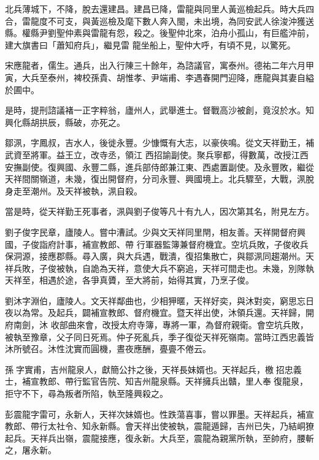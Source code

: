 \begin{pinyinscope}
 北兵薄城下，不降，脫去還建昌。建昌已降，雷龍與同里人黃巡檢起兵。時大兵四合，雷龍度不可支，與黃巡檢及麾下數人奔入閩，未出境，為同安武人徐浚沖獲送縣。權縣尹劉聖仲素與雷龍有怨，殺之。後聖仲北來，泊舟小孤山，有巨艦沖前，建大旗書曰「蕭知府兵」，繼見雷
 龍坐船上，聖仲大呼，有頃不見，以驚死。



 宋應龍者，儒生。通兵，出入行陳三十餘年，為諮議官，寓泰州。德祐二年六月甲寅，大兵至泰州，裨校孫貴、胡惟孝、尹端甫、李遇春開門迎降，應龍與其妻自縊於圃中。



 是時，提刑諮議褚一正字粹翁，廬州人，武舉進士。督戰高沙被創，竟沒於水。知興化縣胡拱辰，縣破，亦死之。



 鄒洬，字鳳叔，吉水人，後徙永豐。少慷慨有大志，以豪俠鳴。從文天祥勤王，補武資至將軍。益王立，改寺丞，領江
 西招諭副使。聚兵寧都，得數萬，改授江西安撫副使。復興國、永豐二縣，進兵部侍郎兼江東、西處置副使。及永豐敗，繼從天祥間關嶺道，未幾，復出開督府，分司永豐、興國境上。北兵驟至，大戰，洬脫身走至潮州。及天祥被執，洬自殺。



 當是時，從天祥勤王死事者，洬與劉子俊等凡十有九人，因次第其名，附見左方。



 劉子俊字民章，廬陵人。嘗中漕試。少與文天祥同里閈，相友善。天祥開督府興國，子俊詣府計事，補宣教郎、帶
 行軍器監簿兼督府機宜。空坑兵敗，子俊收兵保洞源，接應郡縣。尋入廣，與大兵遇，戰潰，復招集散亡，與鄒洬同趨潮州。天祥兵敗，子俊被執，自詭為天祥，意使大兵不窮追，天祥可間走也。未幾，別隊執天祥至，相遇於途，各爭真贗，至大將前，始得其實，乃烹子俊。



 劉沐字淵伯，廬陵人。文天祥鄰曲也，少相狎暱，天祥好奕，與沐對奕，窮思忘日夜以為常。及起兵，闢補宣教郎、督府機宜。暨天祥出使，沐領兵還。天祥歸，開府南劍，沐
 收部曲來會，改授太府寺簿，專將一軍，為督府親衛。會空坑兵敗，被執至豫章，父子同日死焉。仲子死亂兵，季子復從天祥死嶺南。當時江西忠義皆沐所號召。沐性沈實而圓機，晝夜應酬，亹亹不倦云。



 孫𬃄字實甫，吉州龍泉人，獻簡公抃之後，天祥長妹婿也。天祥起兵，檄𬃄招忠義士，補宣教郎、帶行監官告院、知吉州龍泉縣。天祥擁兵出贛，里人奉𬃄復龍泉，拒守不下，尋為叛者所陷，執至隆興殺之。



 彭震龍字雷可，永新人，天祥次妹婿也。性跌蕩喜事，嘗以罪墨。天祥起兵，補宣教郎、帶行太社令、知永新縣。會天祥出使被執，震龍遁歸，吉州已失，乃結峒獠起兵。天祥兵出嶺，震龍接應，復永新。大兵至，震龍為親黨所執，至帥府，腰斬之，屠永新。




\end{pinyinscope}

